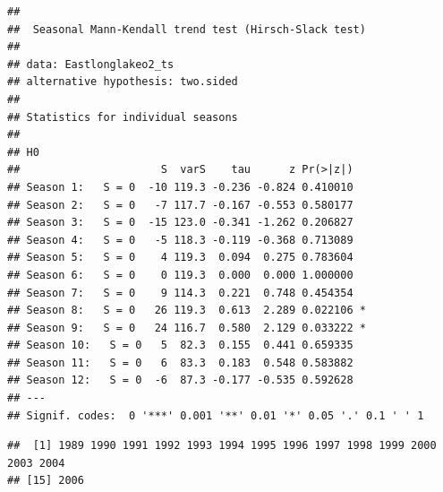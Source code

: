 \documentclass[12pt,]{article}
\newenvironment{Shaded}{\begin{snugshade}}{\end{snugshade}}
\newcommand{\KeywordTok}[1]{\textcolor[rgb]{0.13,0.29,0.53}{\textbf{#1}}}
\newcommand{\DataTypeTok}[1]{\textcolor[rgb]{0.13,0.29,0.53}{#1}}
\newcommand{\DecValTok}[1]{\textcolor[rgb]{0.00,0.00,0.81}{#1}}
\newcommand{\StringTok}[1]{\textcolor[rgb]{0.31,0.60,0.02}{#1}}
\newcommand{\CommentTok}[1]{\textcolor[rgb]{0.56,0.35,0.01}{\textit{#1}}}
\newcommand{\OperatorTok}[1]{\textcolor[rgb]{0.81,0.36,0.00}{\textbf{#1}}}
\newcommand{\NormalTok}[1]{#1}
\begin{document}
\begin{verbatim}
## 
##  Seasonal Mann-Kendall trend test (Hirsch-Slack test)
## 
## data: Eastlonglakeo2_ts
## alternative hypothesis: two.sided
## 
## Statistics for individual seasons
## 
## H0
##                      S  varS    tau      z Pr(>|z|)  
## Season 1:   S = 0  -10 119.3 -0.236 -0.824 0.410010  
## Season 2:   S = 0   -7 117.7 -0.167 -0.553 0.580177  
## Season 3:   S = 0  -15 123.0 -0.341 -1.262 0.206827  
## Season 4:   S = 0   -5 118.3 -0.119 -0.368 0.713089  
## Season 5:   S = 0    4 119.3  0.094  0.275 0.783604  
## Season 6:   S = 0    0 119.3  0.000  0.000 1.000000  
## Season 7:   S = 0    9 114.3  0.221  0.748 0.454354  
## Season 8:   S = 0   26 119.3  0.613  2.289 0.022106 *
## Season 9:   S = 0   24 116.7  0.580  2.129 0.033222 *
## Season 10:   S = 0   5  82.3  0.155  0.441 0.659335  
## Season 11:   S = 0   6  83.3  0.183  0.548 0.583882  
## Season 12:   S = 0  -6  87.3 -0.177 -0.535 0.592628  
## ---
## Signif. codes:  0 '***' 0.001 '**' 0.01 '*' 0.05 '.' 0.1 ' ' 1
\end{verbatim}

\begin{Shaded}
\end{Shaded}

\begin{verbatim}
##  [1] 1989 1990 1991 1992 1993 1994 1995 1996 1997 1998 1999 2000 2003 2004
## [15] 2006
\end{verbatim}

\begin{Shaded}
\end{Shaded}
\end{document}
